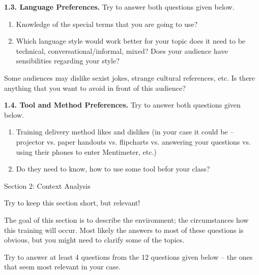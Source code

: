 \documentclass[jou]{apa6}
\begin{document}
{\bf 1.3. Language Preferences.} Try to answer both questions given below.
\begin{enumerate}[(1)]
\item Knowledge of the special terms that you are going to use?
\item Which language style would work better for your topic \textendash{} 
does it need to be technical, conversational/informal, mixed? 
Does your audience have sensibilities regarding your style? 
\end{enumerate}
Some audiences may dislike sexist jokes, strange cultural references, etc. 
Is there anything that you want to avoid in front of this audience?

{\bf 1.4. Tool and Method Preferences.} Try to answer both questions given below.
\begin{enumerate}[(1)]
\item Training delivery method likes and dislikes (in your case it could be – projector vs. paper handouts vs. flipcharts vs. answering your questions vs. using their phones to enter Mentimeter, etc.)
\item Do they need to know, how to use some tool befor your class?
\end{enumerate}


\vspace{20pt}
{\large  Section 2: Context Analysis} 

{\footnotesize Try to keep this section short, but relevant!}

The goal of this section is to describe the environment; the circumstances \textendash{} 
how this training will occur. Most likely the answers to most of these questions is obvious, 
but you might need to clarify some of the topics.

Try to answer at least 4 questions from the 12 questions given below – the ones that seem most relevant in your case.
\end{document}
